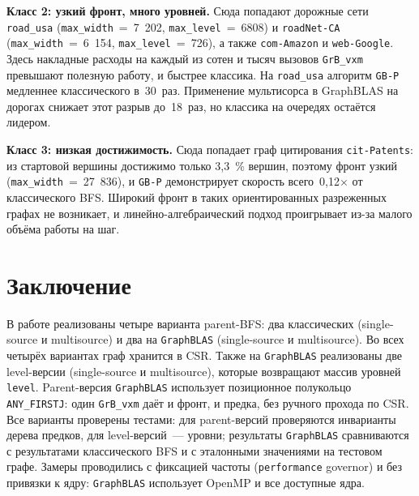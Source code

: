 \documentclass[a4paper]{article}
\begin{document}
\textbf{Класс 2: узкий фронт, много уровней.} Сюда попадают дорожные сети \texttt{road\_usa} (\texttt{max\_width}~=~7~202, \texttt{max\_level}~=~6808) и \texttt{roadNet-CA} (\texttt{max\_width}~=~6~154, \texttt{max\_level}~=~726), а также \texttt{com-Amazon} и \texttt{web-Google}. Здесь накладные расходы на каждый из сотен и тысяч вызовов \texttt{GrB\_vxm} превышают полезную работу, и быстрее классика. На \texttt{road\_usa} алгоритм \texttt{GB-P} медленнее классического в~30~раз. Применение мультисорса в GraphBLAS на дорогах снижает этот разрыв до~18~раз, но классика на очередях остаётся лидером.

\textbf{Класс 3: низкая достижимость.} Сюда попадает граф цитирования \texttt{cit-Patents}: из стартовой вершины достижимо только 3,3~{\%} вершин, поэтому фронт узкий (\texttt{max\_width}~=~27~836), и \texttt{GB-P} демонстрирует скорость всего~0,12$\times$ от классического BFS. Широкий фронт в таких ориентированных разреженных графах не возникает, и линейно-алгебраический подход проигрывает из-за малого объёма работы на шаг.

\section{Заключение}

В работе реализованы четыре варианта parent-BFS: два классических (single-source и multisource) и два на \texttt{GraphBLAS} (single-source и multisource). Во всех четырёх вариантах граф хранится в CSR. Также на \texttt{GraphBLAS} реализованы две level-версии (single-source и multisource), которые возвращают массив уровней \texttt{level}. Parent-версия \texttt{GraphBLAS} использует позиционное полукольцо \texttt{ANY\_FIRSTJ}: один \texttt{GrB\_vxm} даёт и фронт, и предка, без ручного прохода по CSR. Все варианты проверены тестами: для parent-версий проверяются инварианты дерева предков, для level-версий~--- уровни; результаты \texttt{GraphBLAS} сравниваются с результатами классического BFS и с эталонными значениями на тестовом графе. Замеры проводились с фиксацией частоты (\texttt{performance} governor) и без привязки к ядру: \texttt{GraphBLAS} использует OpenMP и все доступные ядра.
\end{document}
